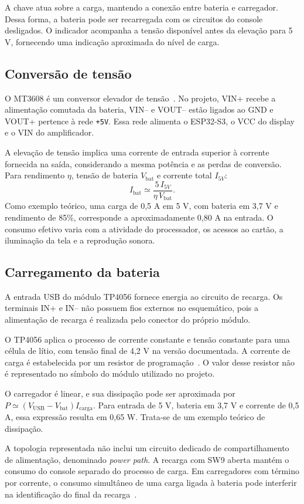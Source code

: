 \documentclass[12pt,a4paper]{article}
\begin{document}
A chave atua sobre a carga, mantendo a conexão entre bateria e carregador. Dessa forma, a bateria pode ser recarregada com os circuitos do console desligados. O indicador acompanha a tensão disponível antes da elevação para 5 V, fornecendo uma indicação aproximada do nível de carga.

\subsection{Conversão de tensão}
O MT3608 é um conversor elevador de tensão~\cite{mt}. No projeto, VIN+ recebe a alimentação comutada da bateria, VIN-- e VOUT-- estão ligados ao GND e VOUT+ pertence à rede \texttt{+5V}. Essa rede alimenta o ESP32-S3, o VCC do display e o VIN do amplificador.

A elevação de tensão implica uma corrente de entrada superior à corrente fornecida na saída, considerando a mesma potência e as perdas de conversão. Para rendimento $\eta$, tensão de bateria $V_{\mathrm{bat}}$ e corrente total $I_{5V}$:
\[
  I_{\mathrm{bat}}\simeq\frac{5\,I_{5V}}{\eta\,V_{\mathrm{bat}}}.
\]
Como exemplo teórico, uma carga de 0,5 A em 5 V, com bateria em 3,7 V e rendimento de 85\%, corresponde a aproximadamente 0,80 A na entrada. O consumo efetivo varia com a atividade do processador, os acessos ao cartão, a iluminação da tela e a reprodução sonora.

\subsection{Carregamento da bateria}
A entrada USB do módulo TP4056 fornece energia ao circuito de recarga. Os terminais IN+ e IN-- não possuem fios externos no esquemático, pois a alimentação de recarga é realizada pelo conector do próprio módulo.

O TP4056 aplica o processo de corrente constante e tensão constante para uma célula de lítio, com tensão final de 4,2 V na versão documentada. A corrente de carga é estabelecida por um resistor de programação~\cite{tp}. O valor desse resistor não é representado no símbolo do módulo utilizado no projeto.

O carregador é linear, e sua dissipação pode ser aproximada por $P\simeq(V_{\mathrm{USB}}-V_{\mathrm{bat}})I_{\mathrm{carga}}$. Para entrada de 5 V, bateria em 3,7 V e corrente de 0,5 A, essa expressão resulta em 0,65 W. Trata-se de um exemplo teórico de dissipação.

A topologia representada não inclui um circuito dedicado de compartilhamento de alimentação, denominado \textit{power path}. A recarga com SW9 aberta mantém o consumo do console separado do processo de carga. Em carregadores com término por corrente, o consumo simultâneo de uma carga ligada à bateria pode interferir na identificação do final da recarga~\cite{loadsharing}.
\end{document}
